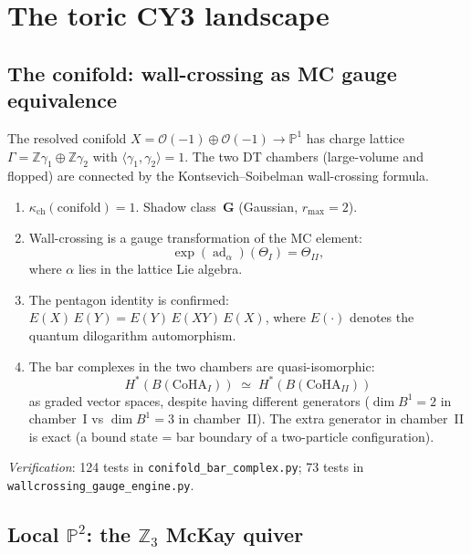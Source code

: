 \documentclass[11pt]{article}
\newcommand{\cO}{\mathcal{O}}
\newcommand{\Z}{\mathbb{Z}}
\newcommand{\bP}{\mathbb{P}}
\newcommand{\CoHA}{\mathrm{CoHA}}
\newcommand{\ad}{\operatorname{ad}}
\begin{document}
\section{The toric CY3 landscape}
\label{sec:toric-landscape}

\subsection{The conifold: wall-crossing as MC gauge equivalence}
\label{subsec:conifold-full}

The resolved conifold $X = \cO(-1) \oplus \cO(-1) \to \bP^1$ has charge lattice $\Gamma = \Z \gamma_1 \oplus \Z \gamma_2$ with $\langle \gamma_1, \gamma_2 \rangle = 1$. The two DT chambers (large-volume and flopped) are connected by the Kontsevich--Soibelman wall-crossing formula.

\begin{theorem}
\label{thm:conifold-wc}
\begin{enumerate}[label=\textup{(\roman*)}]
 \item $\kappa_{\mathrm{ch}}(\text{conifold}) = 1$. Shadow class~$\mathbf{G}$ (Gaussian, $r_{\max} = 2$).
 \item Wall-crossing is a gauge transformation of the MC element:
 \[
 \exp(\ad_\alpha)(\Theta_I) = \Theta_{II},
 \]
 where $\alpha$ lies in the lattice Lie algebra.
 \item The pentagon identity is confirmed: $E(X)\,E(Y) = E(Y)\,E(XY)\,E(X)$, where $E(\cdot)$ denotes the quantum dilogarithm automorphism.
 \item The bar complexes in the two chambers are quasi-isomorphic:
 \[
 H^*(B(\CoHA_I)) \;\simeq\; H^*(B(\CoHA_{II}))
 \]
 as graded vector spaces, despite having different generators ($\dim B^1 = 2$ in chamber~I vs $\dim B^1 = 3$ in chamber~II). The extra generator in chamber~II is exact (a bound state = bar boundary of a two-particle configuration).
\end{enumerate}

\noindent\textit{Verification}: 124 tests in \texttt{conifold\_bar\_complex.py}; 73 tests in \texttt{wallcrossing\_gauge\_engine.py}.
\end{theorem}

\subsection{Local $\bP^2$: the $\Z_3$ McKay quiver}
\label{subsec:local-p2}
\end{document}
